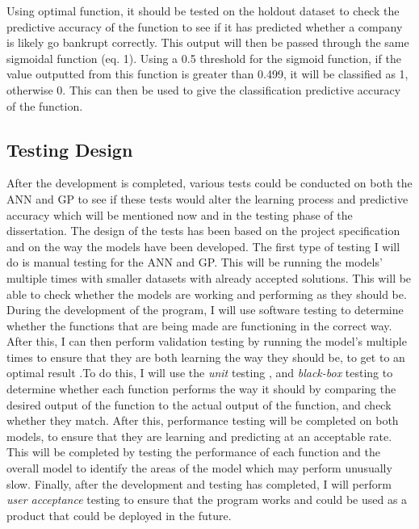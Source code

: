 \documentclass[11pt]{article}
\begin{document}
Using optimal function, it should be tested on the holdout dataset to check the predictive accuracy of the function to see if it has predicted whether a company is likely go bankrupt correctly. This output will then be passed through the same sigmoidal function (eq. 1). Using a 0.5 threshold for the sigmoid function, if the value outputted from this function is greater than 0.499, it will be classified as 1, otherwise 0. This can then be used to give the classification predictive accuracy of the function. 
\subsection{Testing Design}
After the development is completed, various tests could be conducted on both the ANN and GP to see if these tests would alter the learning process and predictive accuracy which will be mentioned now and in the testing phase of the dissertation. The design of the tests has been based on the project specification and on the way the models have been developed. 
The first type of testing I will do is manual testing for the ANN and GP. This will be running  the models' multiple times with smaller datasets with already accepted solutions. This will be able to check whether the models are working and performing as they should be. 
During the development of the program, I will use software testing to determine whether the functions that are being made are functioning in the correct way. After this, I can then perform validation testing by running the model's multiple times to ensure that they are both learning the way they should be, to get to an optimal result .To do this, I will use the \textit{unit} testing , and \textit{black-box} testing to determine whether each function performs the way it should by comparing the desired output of the function to the actual output of the function, and check whether they match. After this, performance testing will be completed on both models, to ensure that they are learning and predicting at an acceptable rate. This will be completed by testing the performance of each function and the overall model to identify the areas of the model which may perform unusually slow. Finally, after the development and testing has completed, I will perform \textit{user acceptance} testing to ensure that the program works and could be used as a product that could be deployed in the future. 
\end{document}
